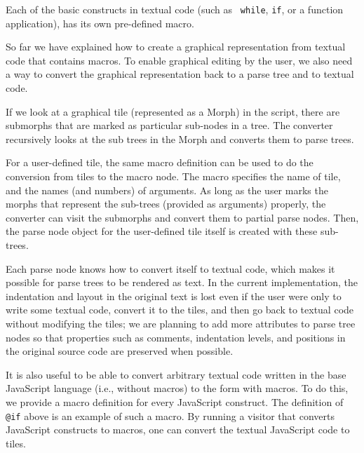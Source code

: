   Each of the basic constructs in textual code (such as {\tt
while}, {\tt if}, or a function application), has its own pre-defined macro.


  So far we have explained how to create a graphical representation from
textual code that contains macros.  To enable graphical
editing by the user, we also need a way to convert the
graphical representation back to a parse tree and to textual code.

  If we look at a graphical tile (represented as a Morph) in the
script, there are submorphs that are marked as particular sub-nodes in
a tree.  The converter recursively looks at the sub trees in the
Morph and converts them to parse trees.

  For a user-defined tile, the same macro definition can be used to do
the conversion from tiles to the macro node.  The macro specifies the
name of tile, and the names (and numbers) of arguments.  As long as
the user marks the morphs that represent the sub-trees (provided as
arguments) properly, the converter can visit the submorphs and convert
them to partial parse nodes.  Then, the parse node object for the user-defined tile itself
is created with these sub-trees.

  Each parse node knows how to convert itself to textual code, which makes it possible for
parse trees to be rendered as text.  In the current
implementation, the indentation and layout in the original text is
lost even if the user were only to write some textual code, convert it to the
tiles, and then go back to textual code without modifying the tiles; we are
planning to add more attributes to parse tree nodes so that
properties such as comments, indentation levels, and positions in the
original source code are preserved when possible.

  It is also useful to be able to convert arbitrary textual code written in the
base JavaScript language (i.e., without macros) to the form with macros.  To do
this, we provide a macro definition for every JavaScript construct.
The definition of {\tt @if} above is an example of such a macro.  By
running a visitor that converts JavaScript constructs to macros,
one can convert the textual JavaScript code to tiles.
